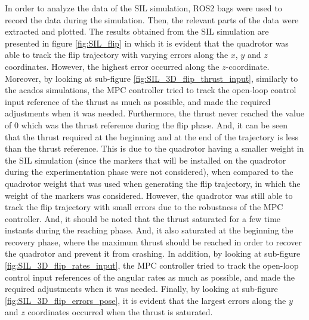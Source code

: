 \documentclass{thesisreport}
\begin{document}
In order to analyze the data of the SIL simulation, ROS2 bags were used to record the data during the simulation. Then, the relevant parts of the data were extracted and plotted. The results obtained from the SIL simulation are presented in figure \ref{fig:SIL_flip} in which it is evident that the quadrotor was able to track the flip trajectory with varying  errors along the $x$, $y$ and $z$ coordinates. However, the highest error occurred along the $z$-coordinate. Moreover, by looking at sub-figure \ref{fig:SIL_3D_flip_thrust_input}, similarly to the acados simulations, the MPC controller tried to track the open-loop control input reference of the thrust as much as possible, and made the required adjustments when it was needed. Furthermore, the thrust never reached the value of 0 which was the thrust reference during the flip phase. And, it can be seen that the thrust required at the beginning and at the end of the trajectory is less than the thrust reference. This is due to the quadrotor having a smaller weight in the SIL simulation (since the markers that will be installed on the quadrotor during the experimentation phase were not considered), when compared to the quadrotor weight that was used when generating the flip trajectory, in which the weight of the markers was considered. 
However, the quadrotor was still able to track the flip trajectory with small errors due to the robustness of the MPC controller. And, it should be noted that the thrust saturated for a few time instants during the reaching phase. And, it also saturated at the beginning the recovery phase, where the maximum thrust should be reached in order to recover the quadrotor and prevent it from crashing.
In addition, by looking at sub-figure \ref{fig:SIL_3D_flip_rates_input}, the MPC controller tried to track the open-loop control input references of the angular rates as much as possible, and made the required adjustments when it was needed. Finally, by looking at sub-figure \ref{fig:SIL_3D_flip_errors_pose}, it is evident that the largest errors along the $y$ and $z$ coordinates occurred when the thrust is saturated.


\newpage
\end{document}
